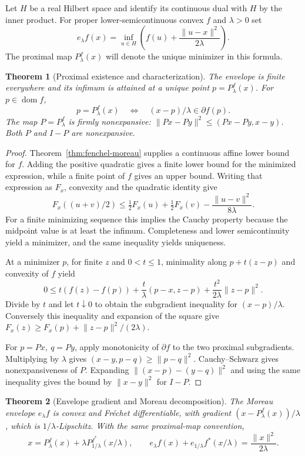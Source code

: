 \documentclass[11pt,oneside,openany]{book}
\theoremstyle{plain}
\newtheorem{theorem}{Theorem}[chapter]
\theoremstyle{definition}
\theoremstyle{remark}
\begin{document}
Let \(H\) be a real Hilbert space and identify its continuous
dual with \(H\) by the inner product. For proper lower-semicontinuous
convex \(f\) and \(\lambda>0\) set
\[
 e_\lambda f(x)
  =\inf_{u\in H}\left(f(u)+\frac{\lVert u-x\rVert^2}{2\lambda}\right).
\]
The proximal map \(P_\lambda^f(x)\) will denote the unique
minimizer in this formula.

\begin{theorem}[Proximal existence and characterization]
\label{thm:prox-characterization}
The envelope is finite everywhere and its infimum is attained
at a unique point \(p=P_\lambda^f(x)\). For \(p\in\operatorname{dom}f\),
\[
 p=P_\lambda^f(x)\quad\Longleftrightarrow\quad
   (x-p)/\lambda\in\partial f(p).
\]
The map \(P=P_\lambda^f\) is firmly nonexpansive:
\(\lVert P x-P y\rVert^2\le (Px-Py,x-y)\).
Both \(P\) and \(I-P\) are nonexpansive.
\end{theorem}

\begin{proof}
Theorem~\ref{thm:fenchel-moreau} supplies a continuous
affine lower bound for \(f\). Adding the positive quadratic
gives a finite lower bound for the minimized expression,
while a finite point of \(f\) gives an upper bound.
Writing that expression as \(F_x\), convexity and the
quadratic identity give
\[
 F_x((u+v)/2)\le
 \tfrac12 F_x(u)+\tfrac12 F_x(v)
   -\frac{\lVert u-v\rVert^2}{8\lambda}.
\]
For a finite minimizing sequence this implies the Cauchy
property because the midpoint value is at least the
infimum. Completeness and lower semicontinuity yield a
minimizer, and the same inequality yields uniqueness.

At a minimizer \(p\), for finite \(z\) and \(0<t\le1\),
minimality along \(p+t(z-p)\) and convexity of \(f\) yield
\[
 0\le t(f(z)-f(p))
       +\frac{t}{\lambda}(p-x,z-p)
       +\frac{t^2}{2\lambda}\lVert z-p\rVert^2.
\]
Divide by \(t\) and let \(t\downarrow0\) to obtain the
subgradient inequality for \((x-p)/\lambda\).
Conversely this inequality and expansion of the square
give \(F_x(z)\ge F_x(p)+\lVert z-p\rVert^2/(2\lambda)\).

For \(p=Px,\ q=Py\), apply monotonicity of \(\partial f\)
to the two proximal subgradients. Multiplying by \(\lambda\)
gives
\((x-y,p-q)\ge\lVert p-q\rVert^2\).
Cauchy--Schwarz gives nonexpansiveness of \(P\).
Expanding
\(\lVert(x-p)-(y-q)\rVert^2\) and using the same inequality
gives the bound by \(\lVert x-y\rVert^2\) for \(I-P\).
\end{proof}

\begin{theorem}[Envelope gradient and Moreau decomposition]
\label{thm:moreau}
The Moreau envelope \(e_\lambda f\) is convex and Fr\'echet differentiable,
with gradient \((x-P_\lambda^f(x))/\lambda\), which is
\(1/\lambda\)-Lipschitz. With the same proximal-map convention,
\[
 x=P_\lambda^f(x)
      +\lambda P_{1/\lambda}^{f^*}(x/\lambda),
 \qquad
 e_\lambda f(x)+e_{1/\lambda}f^*(x/\lambda)
     =\frac{\lVert x\rVert^2}{2\lambda}.
\]
\end{theorem}
\end{document}
